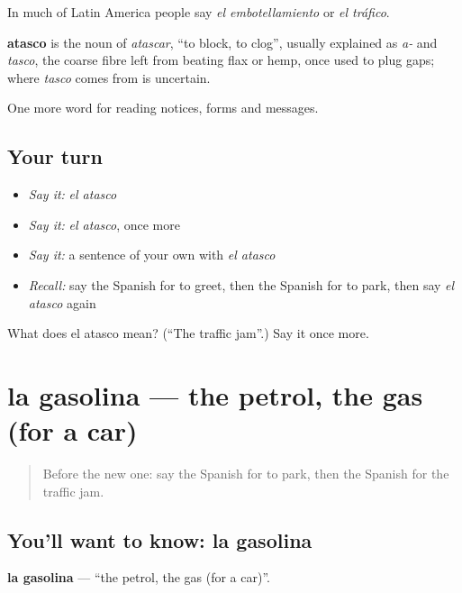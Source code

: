 In much of Latin America people say \emph{el embotellamiento} or \emph{el tráfico}.

\begin{cousinweb}
\textbf{atasco} is the noun of \emph{atascar}, \textquotedblleft{}to block, to clog\textquotedblright{}, usually explained as \emph{a-} and \emph{tasco}, the coarse fibre left from beating flax or hemp, once used to plug gaps; where \emph{tasco} comes from is uncertain.
\end{cousinweb}

\begin{grammarlens}[title={What you've built}]
One more word for reading notices, forms and messages.
\end{grammarlens}

\subsection*{Your turn}
\begin{itemize}
\raggedright
  \item \emph{Say it:} \emph{el atasco}
  \item \emph{Say it:} \emph{el atasco}, once more
  \item \emph{Say it:} a sentence of your own with \emph{el atasco}
  \item \emph{Recall:} say the Spanish for to greet, then the Spanish for to park, then say \emph{el atasco} again
\end{itemize}

\begin{tcolorbox}[breakable,colback=teal!4,colframe=teal!35!black,title={Before you move on}]
What does el atasco mean? (\textquotedblleft{}The traffic jam\textquotedblright{}.) Say it once more.
\end{tcolorbox}
\section[la gasolina]{la gasolina — the petrol, the gas (for a car)}

\label{lesson:ES-C489-gasolina}



\begin{quote}
Before the new one: say the Spanish for to park, then the Spanish for the traffic jam.
\end{quote}

\subsection*{You'll want to know: la gasolina}
\textbf{la gasolina} — \textquotedblleft{}the petrol, the gas (for a car)\textquotedblright{}.

